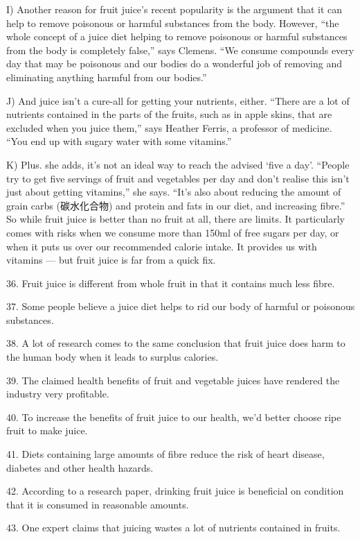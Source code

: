 \documentclass[UTF8,11pt]{ctexart}
\begin{document}
I) Another reason for fruit juice’s recent popularity is the argument that it can help to remove poisonous or harmful substances from the body. However, “the whole concept of a juice diet helping to remove poisonous or harmful substances from the body is completely false,” says Clemens. “We consume compounds every day that may be poisonous and our bodies do a wonderful job of removing and eliminating anything harmful from our bodies.”


J) And juice isn’t a cure-all for getting your nutrients, either. “There are a lot of nutrients contained in the parts of the fruits, such as in apple skins, that are excluded when you juice them,” says Heather Ferris, a professor of medicine. “You end up with sugary water with some vitamins.”


K) Plus. she adds, it’s not an ideal way to reach the advised ‘five a day’. “People try to get five servings of fruit and vegetables per day and don’t realise this isn’t just about getting vitamins,” she says. “It’s also about reducing the amount of grain carbs (碳水化合物) and protein and fats in our diet, and increasing fibre.” So while fruit juice is better than no fruit at all, there are limits. It particularly comes with risks when we consume more than 150ml of free sugars per day, or when it puts us over our recommended calorie intake. It provides us with vitamins — but fruit juice is far from a quick fix.


36. Fruit juice is different from whole fruit in that it contains much less fibre.


37. Some people believe a juice diet helps to rid our body of harmful or poisonous substances.


38. A lot of research comes to the same conclusion that fruit juice does harm to the human body when it leads to surplus calories.


39. The claimed health benefits of fruit and vegetable juices have rendered the industry very profitable.


40. To increase the benefits of fruit juice to our health, we’d better choose ripe fruit to make juice.


41. Diets containing large amounts of fibre reduce the risk of heart disease, diabetes and other health hazards.


42. According to a research paper, drinking fruit juice is beneficial on condition that it is consumed in reasonable amounts.


43. One expert claims that juicing wastes a lot of nutrients contained in fruits.
\end{document}
